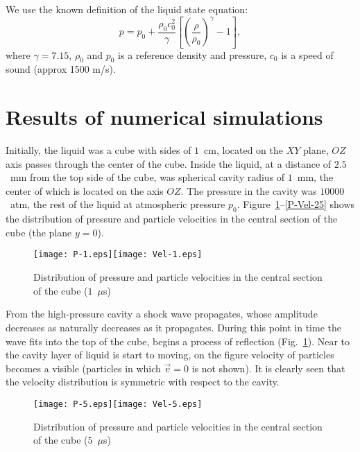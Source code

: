 \documentclass[a4paper]{jpconf}
\begin{document}
We use the known definition of the liquid state equation:  
\[p= p_0 + \frac{\rho_0 c_0^2}{\gamma} \left[ \left( \frac{\rho}{\rho_0} \right)^{\gamma} - 1 \right],\]
where  $\gamma = 7.15$, $\rho_0$ and $p_0$ is a reference density and pressure, $c_0$ is a speed of sound (approx 1500 m/s).

			
\section{Results of numerical simulations}


Initially, the liquid was a cube with sides of $1$~cm, located on the $XY$ plane, $OZ$ axis passes through the center of the cube. Inside the liquid, at a distance of $2.5$~mm from the top side of the cube, was spherical cavity radius of $1$~mm, the center of which is located on the axis $OZ$. The pressure in the cavity was $10000$~atm, the rest of the liquid at atmospheric pressure $p_0$. 
Figure~\ref{P-Vel-1}--\ref{P-Vel-25} shows the distribution of pressure and particle velocities in the central section of the cube (the plane $y=0$).

\begin{figure}
\begin{center}
\texttt{[image: P-1.eps]}\texttt{[image: Vel-1.eps]}
\end{center}
\caption{\label{P-Vel-1} Distribution of pressure and particle velocities in the central section of the cube ($1$~$\mu$s)}
\end{figure}

From the high-pressure cavity a shock wave propagates, whose amplitude decreases as naturally decreases as it propagates. 
During this point in time the wave fits into the top of the cube, begins a process of reflection (Fig.~\ref{P-Vel-1}). 
Near to the cavity layer of liquid is start to moving, on the figure velocity of particles becomes a visible (particles in which $\vec{v} = 0$ is not shown). It is clearly seen that the velocity distribution is symmetric with respect to the cavity.
 
\begin{figure}
\begin{center}
\texttt{[image: P-5.eps]}\texttt{[image: Vel-5.eps]}
\end{center}
\caption{\label{P-Vel-5} Distribution of pressure and particle velocities in the central section of the cube ($5$~$\mu$s)}
\end{figure}
\end{document}
